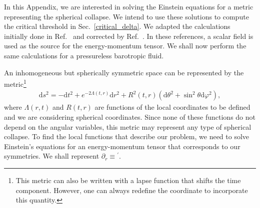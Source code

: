 \documentclass[a4paper,11pt]{article}
\begin{document}
In this Appendix, we are interested in solving the Einstein equations for a metric representing the spherical collapse. We intend to use these solutions to compute the critical threshold in Sec.~\ref{critical_delta}. We adapted the calculations initially done in Ref.~\cite{Gonccalves2000} and corrected by Ref.~\cite{Martin2020}. In these references, a scalar field is used as the source for the energy-momentum tensor. We shall now perform the same calculations for a pressureless barotropic fluid.

An inhomogeneous but spherically symmetric space can be represented by the metric\footnote{This metric can also be written with a lapse function that shifts the time component. However, one can always redefine the coordinate to incorporate this quantity.}
\begin{align}
	\mathrm{d} s^2=-\mathrm{d}t^2+e^{-2 \Lambda(t, r)} \mathrm{d} r^2+R^2(t, r)\left(\mathrm{d} \theta^2+\sin ^2 \theta \mathrm{d} \varphi^2\right)
	,\end{align}
where $\Lambda(r,t)$ and $R(t,r)$ are functions of the local coordinates to be defined and we are considering spherical coordinates. Since none of these functions do not depend on the angular variables, this metric may represent any type of spherical collapse. To find the local functions that describe our problem, we need to solve Einstein's equations for an energy-momentum tensor that corresponds to our symmetries. We shall represent $\partial_r \equiv {}^\prime$.
\end{document}

